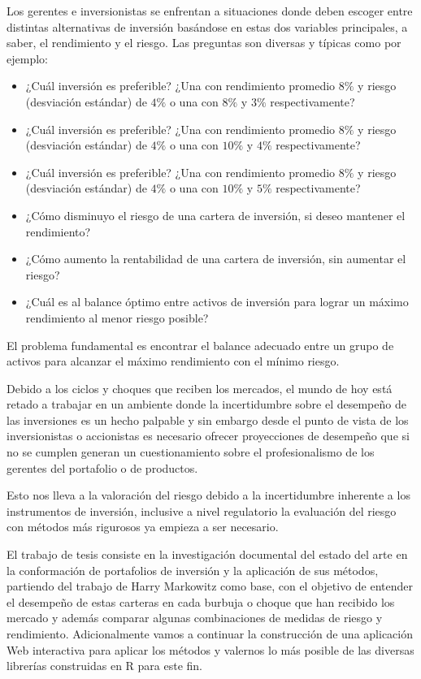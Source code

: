 \documentclass[
  12pt,
]{krantz}
\begin{document}
Los gerentes e inversionistas se enfrentan a situaciones donde deben escoger entre distintas alternativas de inversión basándose en estas dos variables principales, a saber, el rendimiento y el riesgo. Las preguntas son diversas y típicas como por ejemplo:

\begin{itemize}
\item ¿Cuál inversión es preferible? ¿Una con rendimiento promedio $8\%$ y riesgo (desviación estándar) de $4\%$ o una con $8\%$ y $3\%$ respectivamente?
\item ¿Cuál inversión es preferible? ¿Una con rendimiento promedio $8\%$ y riesgo (desviación estándar) de $4\%$ o una con $10\%$ y $4\%$ respectivamente?
\item ¿Cuál inversión es preferible? ¿Una con rendimiento promedio $8\%$ y riesgo (desviación estándar) de $4\%$ o una con $10\%$ y $5\%$ respectivamente?
\item ¿Cómo disminuyo el riesgo de una cartera de inversión, si deseo mantener el rendimiento?
\item ¿Cómo aumento la rentabilidad de una cartera de inversión, sin aumentar el riesgo?
\item ¿Cuál es al balance óptimo entre activos de inversión para lograr un máximo rendimiento al menor riesgo posible?
\end{itemize}

El problema fundamental es encontrar el balance adecuado entre un grupo de activos para alcanzar el máximo rendimiento con el mínimo riesgo.

Debido a los ciclos y choques que reciben los mercados, el mundo de hoy está retado a trabajar en un ambiente donde la incertidumbre sobre el desempeño de las inversiones es un hecho palpable y sin embargo desde el punto de vista de los inversionistas o accionistas es necesario ofrecer proyecciones de desempeño que si no se cumplen generan un cuestionamiento sobre el profesionalismo de los gerentes del portafolio o de productos.

Esto nos lleva a la valoración del riesgo debido a la incertidumbre inherente a los instrumentos de inversión, inclusive a nivel regulatorio la evaluación del riesgo con métodos más rigurosos ya empieza a ser necesario.

El trabajo de tesis consiste en la investigación documental del estado del arte en la conformación de portafolios de inversión y la aplicación de sus métodos, partiendo del trabajo de Harry Markowitz como base, con el objetivo de entender el desempeño de estas carteras en cada burbuja o choque que han recibido los mercado y además comparar algunas combinaciones de medidas de riesgo y rendimiento. Adicionalmente vamos a continuar la construcción de una aplicación Web interactiva para aplicar los métodos y valernos lo más posible de las diversas librerías construidas en R para este fin.
\end{document}
